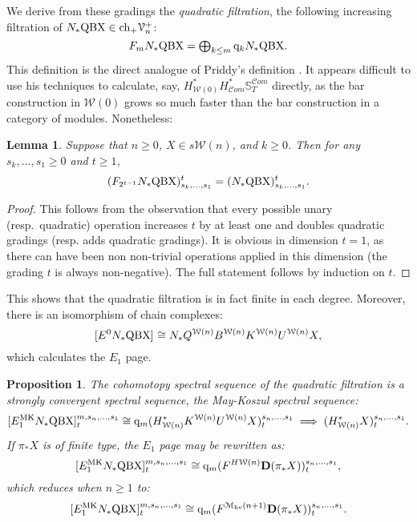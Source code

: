 \documentclass[11pt]{amsart} \renewcommand{\baselinestretch}{1.2}
\theoremstyle{plain}
\newtheorem{lem}[thm]{Lemma}
\newtheorem{prop}[thm]{Proposition}
\theoremstyle{definition}
\newcommand{\scrC}{\mathscr{C}}
\newcommand{\calV}{\mathcal{V}}
\newcommand{\calw}{\mathcal{W}}
\newcommand{\calMhv}{\mathcal{M}_\mathrm{hv}}
\newcommand{\vect}[2]{\calV^{#1}_{#2}}
\newcommand{\HA}[1]{H#1}
\newcommand{\quadgrad}[1]{\mathrm{q}_{#1}}
\newcommand{\complexes}{\mathrm{ch}_+}
\newcommand{\algs}{{\scrC\!\textit{om}}}
\newcommand{\E}[5]{[E^{#1}_{#2}#3]^{#4}_{#5}}
\newcommand{\dual}{\mathbf{D}}
\begin{document}
\begin{May sseq and vanishing line}
We derive from these gradings the \emph{quadratic filtration}, the following increasing filtration of $N_*\textup{QBX}\in \complexes \vect{+}{n}$:
\[F_mN_*\textup{QBX}=\textstyle\bigoplus_{k\leq m} \quadgrad{k}N_*\textup{QBX}. \]
This definition is the direct analogue of Priddy's definition \cite{PriddyKoszul.pdf}. It appears difficult to use his techniques to calculate, say, $H^*_{\calw(0)}H^*_\algs\mathbb{S}^{\algs}_T$ directly, as the bar construction in $\calw(0)$ grows so much faster than the bar construction in a category of modules. Nonetheless:
\begin{lem}
Suppose that $n\geq0$, $X\in s\calw(n)$, and $k\geq0$. Then for any $s_k,\ldots,s_1\geq0$ and $t\geq1$,
\[(F_{2^{t-1}}N_*\textup{QBX})_{{s_k,\ldots,s_1}}^t=(N_*\textup{QBX})_{{s_k,\ldots,s_1}}^t.\]
\end{lem}
\begin{proof}
This follows from the observation that every possible unary (resp.\ quadratic) operation increases $t$ by at least one and doubles quadratic gradings (resp. adds quadratic gradings). It is obvious in dimension $t=1$, as there can have been non non-trivial operations applied in this dimension (the grading $t$ is always non-negative). The full statement follows by induction on $t$.
%
%
\end{proof}
This shows that the quadratic filtration is in fact finite in each degree.
Moreover, there is an isomorphism of chain complexes:
\[\E{0}{}{N_*\textup{QBX}}{}{}\cong N_*Q^{\calw(n)}B^{\calw(n)}K^{\calw(n)}U^{\calw(n)}X,\]
which calculates the $E_1$ page.
\begin{prop}
The cohomotopy spectral sequence of the quadratic filtration is a strongly convergent spectral sequence, the \emph{May-Koszul} spectral sequence:
\[\E{\textup{MK}}{1}{N_*\textup{QBX}}{m,s_n,\ldots,s_1}{t}\cong \quadgrad{m}(H^*_{\calw(n)}K^{\calw(n)}U^{\calw(n)}X)^{s_n,\ldots,s_1}_{t}\implies (H^*_{\calw(n)}X)^{s_n,\ldots,s_1}_{t}.\]
If $\pi_*X$ is of finite type, the $E_1$ page may be rewritten as:
\[\E{\textup{MK}}{1}{N_*\textup{QBX}}{m,s_n,\ldots,s_1}{t}\cong \quadgrad{m}(F^{\HA{\calw(n)}}\dual(\pi_*X))^{s_n,\ldots,s_1}_{t},\]
which reduces when $n\geq1$ to:
\[\E{\textup{MK}}{1}{N_*\textup{QBX}}{m,s_n,\ldots,s_1}{t}\cong \quadgrad{m}(F^{\calMhv(n+1)}\dual(\pi_*X))^{s_n,\ldots,s_1}_{t}.\]
\end{prop}


\end{May sseq and vanishing line}
\end{document}
